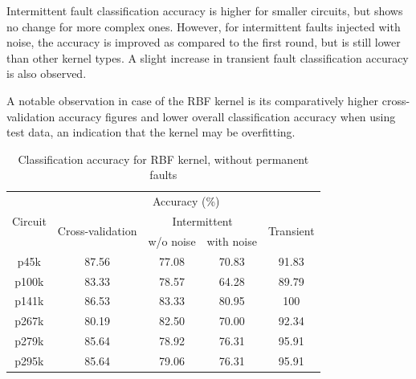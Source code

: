 Intermittent fault classification accuracy is higher for smaller circuits, but shows no change for more complex ones. However, for intermittent faults injected with noise, the accuracy is improved as compared to the first round, but is still lower than other kernel types. A slight increase in transient fault classification accuracy is also observed. 

A notable observation in case of the RBF kernel is its comparatively higher cross-validation accuracy figures and lower overall classification accuracy when using test data, an indication that the kernel may be overfitting.

\begin{table}[h]
	\captionsetup{justification=centering}
\begin{tabular}{ccccc}
\hline
\multirow{3}{*}{Circuit} & \multicolumn{4}{c}{Accuracy (\%)}                                                                 \\ \cline{2-5} 
                         & \multirow{2}{*}{Cross-validation} & \multicolumn{2}{c}{Intermittent} & \multirow{2}{*}{Transient} \\ \cline{3-4}
                         &                                   & w/o noise      & with noise      &                            \\ \hline
p45k                     & 87.56                             & 77.08          & 70.83           & 91.83                      \\
p100k                    & 83.33                             & 78.57          & 64.28           & 89.79                      \\
p141k                    & 86.53                             & 83.33          & 80.95           & 100                        \\
p267k                    & 80.19                             & 82.50          & 70.00           & 92.34                      \\
p279k                    & 85.64                             & 78.92          & 76.31           & 95.91                      \\
p295k                    & 85.64                             & 79.06          & 76.31           & 95.91  						  \\
\hline
\end{tabular}
\caption {Classification accuracy for RBF kernel, without permanent faults}
\label{tab:rbfwop}
\end{table}

